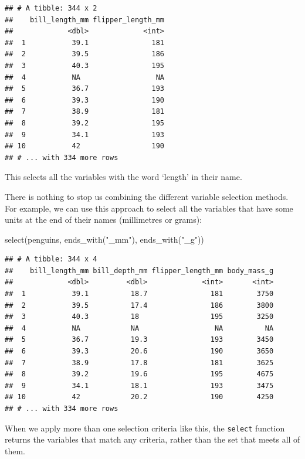 \documentclass[
]{book}
\newenvironment{Shaded}{\begin{snugshade}}{\end{snugshade}}
\newcommand{\FunctionTok}[1]{\textcolor[rgb]{0.00,0.00,0.00}{#1}}
\newcommand{\NormalTok}[1]{#1}
\newcommand{\StringTok}[1]{\textcolor[rgb]{0.31,0.60,0.02}{#1}}
\begin{document}
\begin{verbatim}
## # A tibble: 344 x 2
##    bill_length_mm flipper_length_mm
##             <dbl>             <int>
##  1           39.1               181
##  2           39.5               186
##  3           40.3               195
##  4           NA                  NA
##  5           36.7               193
##  6           39.3               190
##  7           38.9               181
##  8           39.2               195
##  9           34.1               193
## 10           42                 190
## # ... with 334 more rows
\end{verbatim}

This selects all the variables with the word `length' in their name.

There is nothing to stop us combining the different variable selection methods. For example, we can use this approach to select all the variables that have some units at the end of their names (millimetres or grams):

\begin{Shaded}
\begin{Highlighting}[]
\FunctionTok{select}\NormalTok{(penguins, }\FunctionTok{ends\_with}\NormalTok{(}\StringTok{"\_mm"}\NormalTok{), }\FunctionTok{ends\_with}\NormalTok{(}\StringTok{"\_g"}\NormalTok{))}
\end{Highlighting}
\end{Shaded}

\begin{verbatim}
## # A tibble: 344 x 4
##    bill_length_mm bill_depth_mm flipper_length_mm body_mass_g
##             <dbl>         <dbl>             <int>       <int>
##  1           39.1          18.7               181        3750
##  2           39.5          17.4               186        3800
##  3           40.3          18                 195        3250
##  4           NA            NA                  NA          NA
##  5           36.7          19.3               193        3450
##  6           39.3          20.6               190        3650
##  7           38.9          17.8               181        3625
##  8           39.2          19.6               195        4675
##  9           34.1          18.1               193        3475
## 10           42            20.2               190        4250
## # ... with 334 more rows
\end{verbatim}

When we apply more than one selection criteria like this, the \texttt{select} function returns the variables that match any criteria, rather than the set that meets all of them.
\end{document}

